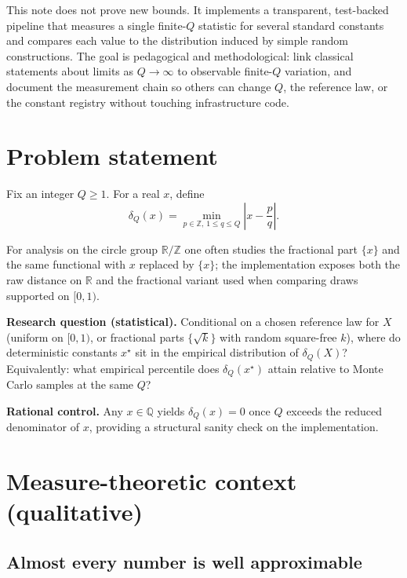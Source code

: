 \documentclass[
]{article}
\begin{document}
This note does not prove new bounds. It implements a transparent,
test-backed pipeline that measures a single finite-\(Q\) statistic for
several standard constants and compares each value to the distribution
induced by simple random constructions. The goal is pedagogical and
methodological: link classical statements about limits as \(Q\to\infty\)
to observable finite-\(Q\) variation, and document the measurement chain
so others can change \(Q\), the reference law, or the constant registry
without touching infrastructure code.

\newpage

\section{Problem statement}\label{problem-statement}

Fix an integer \(Q \geq 1\). For a real \(x\), define \begin{equation}
\label{eq:delta}
\delta_Q(x) = \min_{p \in \mathbb{Z},\, 1 \leq q \leq Q} \left| x - \frac{p}{q} \right|.
\end{equation}

For analysis on the circle group \(\mathbb{R}/\mathbb{Z}\) one often
studies the fractional part \(\{x\}\) and the same functional with \(x\)
replaced by \(\{x\}\); the implementation exposes both the raw distance
on \(\mathbb{R}\) and the fractional variant used when comparing draws
supported on \([0,1)\).

\textbf{Research question (statistical).} Conditional on a chosen
reference law for \(X\) (uniform on \([0,1)\), or fractional parts
\(\{\sqrt{k}\}\) with random square-free \(k\)), where do deterministic
constants \(x^\star\) sit in the empirical distribution of
\(\delta_Q(X)\)? Equivalently: what empirical percentile does
\(\delta_Q(x^\star)\) attain relative to Monte Carlo samples at the same
\(Q\)?

\textbf{Rational control.} Any \(x \in \mathbb{Q}\) yields
\(\delta_Q(x)=0\) once \(Q\) exceeds the reduced denominator of \(x\),
providing a structural sanity check on the implementation.

\newpage

\section{Measure-theoretic context
(qualitative)}\label{measure-theoretic-context-qualitative}

\subsection{Almost every number is well
approximable}\label{almost-every-number-is-well-approximable}
\end{document}
